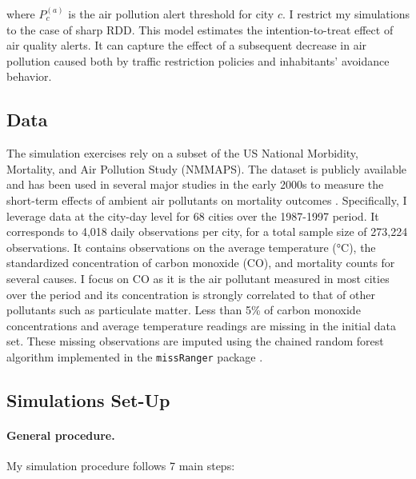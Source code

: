 \documentclass[12pt]{article}
\begin{document}
        \noindent where $P^{(a)}_{c}$ is the air pollution alert threshold for city $c$. I restrict my simulations to the case of sharp RDD. This model estimates the intention-to-treat effect of air quality alerts.  It can capture the effect of a subsequent decrease in air pollution caused both by traffic restriction policies and inhabitants' avoidance behavior. 
        
        \subsection{Data}
        
        The simulation exercises rely on a subset of the US National Morbidity, Mortality, and Air Pollution Study (NMMAPS). The dataset is publicly available and has been used in several major studies in the early 2000s to measure the short-term effects of ambient air pollutants on mortality outcomes \citep{peng2008statistical}. Specifically, I leverage data at the city-day level for 68 cities over the 1987-1997 period. It corresponds to 4,018 daily observations per city, for a total sample size of 273,224 observations. It contains observations on the average temperature (°C), the standardized concentration of carbon monoxide (CO), and mortality counts for several causes. I focus on CO as it is the air pollutant measured in most cities over the period and its concentration is strongly correlated to that of other pollutants such as particulate matter. Less than 5\% of carbon monoxide concentrations and average temperature readings are missing in the initial data set. These missing observations are imputed using the chained random forest algorithm implemented in the \texttt{missRanger} package \citep{mayer_missranger_2019}.
        
        \subsection{Simulations Set-Up}
        
        \paragraph{General procedure.} My simulation procedure follows 7 main steps:
        
\end{document}

